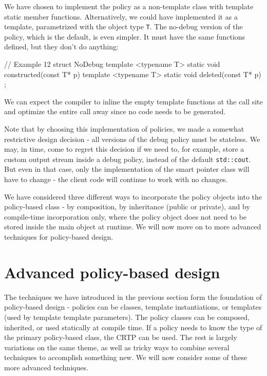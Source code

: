 We have chosen to implement the policy as a non-template class with template static member functions. Alternatively, we could have implemented it as a template, parametrized with the object type \texttt{T}. The no-debug version of the policy, which is the default, is even simpler. It must have the same functions defined, but they don't do anything:

\begin{code}
// Example 12
struct NoDebug {
  template <typename T>
    static void constructed(const T* p) {}
  template <typename T> static void deleted(const T* p) {}
};
\end{code}

We can expect the compiler to inline the empty template functions at the call site and optimize the entire call away since no code needs to be generated.

Note that by choosing this implementation of policies, we made a somewhat restrictive design decision - all versions of the debug policy must be stateless. We may, in time, come to regret this decision if we need to, for example, store a custom output stream inside a debug policy, instead of the default \texttt{std::cout}. But even in that case, only the implementation of the smart pointer class will have to change - the client code will continue to work with no changes.

We have considered three different ways to incorporate the policy objects into the policy-based class - by composition, by inheritance (public or private), and by compile-time incorporation only, where the policy object does not need to be stored inside the main object at runtime. We will now move on to more advanced techniques for policy-based design.

\section{Advanced policy-based design}

The techniques we have introduced in the previous section form the foundation of policy-based design - policies can be classes, template instantiations, or templates (used by template template parameters). The policy classes can be composed, inherited, or used statically at compile time. If a policy needs to know the type of the primary policy-based class, the CRTP can be used. The rest is largely variations on the same theme, as well as tricky ways to combine several techniques to accomplish something new. We will now consider some of these more advanced techniques.

